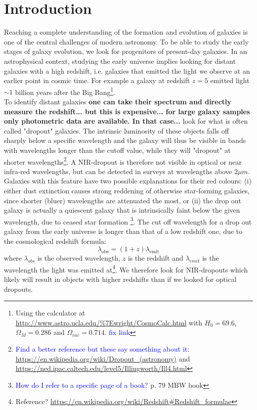\section{Introduction}
Reaching a complete understanding of the formation and evolution of galaxies is one of the central challenges of modern astronomy. To be able to study the early stages of galaxy evolution, we look for progenitors of present-day galaxies. In an astrophysical context, studying the early universe implies looking for distant galaxies with a high redshift, i.e. galaxies that emitted the light we observe at an earlier point in cosmic time. For example a galaxy at redshift $z=5$ emitted light $\sim1$ billion years after the Big Bang\footnote{Using the calculator at \url{http://www.astro.ucla.edu/\%7Ewright/CosmoCalc.html} with $H_0=69.6$, $\Omega_M=0.286$ and $\Omega_{vac}=0.714$. \textcolor{blue}{fix link}}. \\

To identify distant galaxies \textbf{ one can take their spectrum and directly measure the redshift... but this is expensive... for large galaxy samples only photometric data are available. In that case...} look for what is often called "dropout" galaxies. The intrinsic luminosity of these objects falls off sharply below a specific wavelength and the galaxy will thus be visible in bands with wavelengths longer than the cutoff value, while they will "dropout" at shorter wavelengths\footnote{ \textcolor{blue}{Find a better reference but these say something about it:} \url{https://en.wikipedia.org/wiki/Dropout_(astronomy)} and \url{https://ned.ipac.caltech.edu/level5/Illingworth/Ill4.html}}.
A NIR-dropout is therefore not visible in optical or near infra-red wavelengths, but can be detected in surveys at wavelengths above $2 \si{\mu m}$. Galaxies with this feature have two possible explanations for their red colours: (i) either dust extinction causes strong reddening of otherwise star-forming galaxies, since shorter (bluer) wavelengths are attenuated the most, or (ii) the drop out galaxy is actually a quiescent galaxy that is intrinsically faint below the given wavelength, due to ceased star formation \footnote{\textcolor{blue}{How do I refer to a specific page of a book?} p. 79 MBW book }. The cut off wavelength for a drop out galaxy from the early universe is longer than that of a low redshift one, due to the cosmological redshift formula:
\begin{equation}
    \lambda_\mathrm{obs} = (1+z)  \lambda_\mathrm{emit}
\end{equation}
where $\lambda_{obs}$ is the observed wavelength, $z$ is the redshift and $\lambda_{emit}$ is the wavelength the light was emitted at\footnote{Reference? \url{https://en.wikipedia.org/wiki/Redshift\#Redshift_formulae} }. We therefore look for NIR-dropouts which likely will result in objects with higher redshifts than if we looked for optical dropouts.\\

